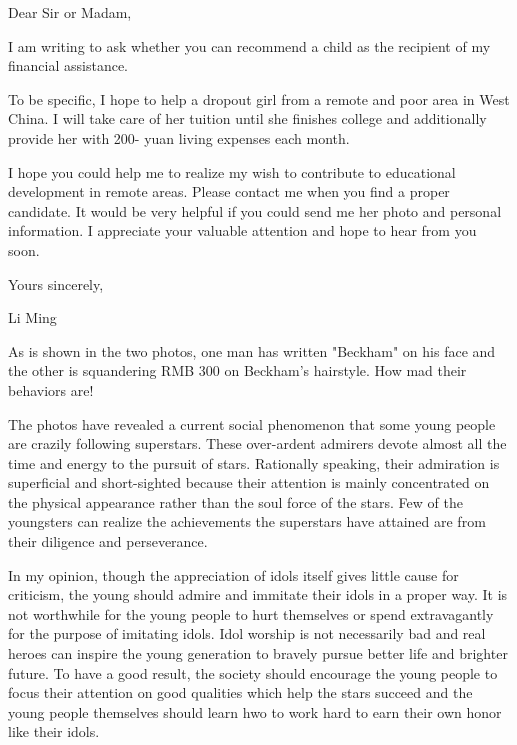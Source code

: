Dear Sir or Madam,

I am writing to ask whether you can recommend a child as the recipient of my financial assistance.

To be specific, I hope to help a dropout girl from a remote and poor area in West China. I will take care of her tuition until she finishes college and additionally provide her with 200- yuan living expenses each month.

I hope you could help me to realize my wish to contribute to educational development in remote areas. Please contact me when you find a proper candidate. It would be very helpful if you could send me her photo and personal information. I appreciate your valuable attention and hope to hear from you soon.

\begin{flushright}Yours sincerely,

Li Ming\end{flushright}

As is shown in the two photos, one man has written "Beckham" on his face and the other is squandering RMB 300 on Beckham's hairstyle. How mad their behaviors are!

The photos have revealed a current social phenomenon that some young people are crazily following superstars. These over-ardent admirers devote almost all the time and energy to the pursuit of stars. Rationally speaking, their admiration is superficial and short-sighted because their attention is mainly concentrated on the physical appearance rather than the soul force of the stars. Few of the youngsters can realize the achievements the superstars have attained are from their diligence and perseverance.

In my opinion, though the appreciation of idols itself gives little cause for criticism, the young should admire and immitate their idols in a proper way. It is not worthwhile for the young people to hurt themselves or spend extravagantly for the purpose of imitating idols. Idol worship is not necessarily bad and real heroes can inspire the young generation to bravely pursue better life and brighter future. To have a good result, the society should encourage the young people to focus their attention on good qualities which help the stars succeed and the young people themselves should learn hwo to work hard to earn their own honor like their idols.